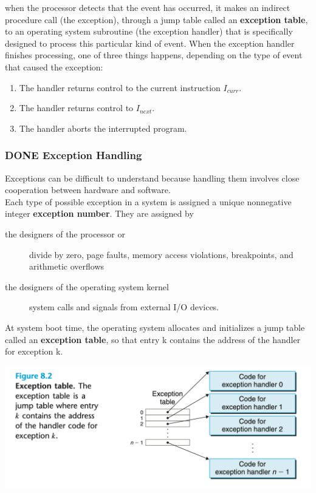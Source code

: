\documentclass[11pt]{article}
\begin{document}
when the processor detects that the event has occurred, it makes an indirect procedure call (the exception), through a jump table called an \textbf{exception table}, to an operating system subroutine (the exception handler) that is specifically designed to process this particular kind of event. When the exception handler finishes processing, one of three things happens, depending on the type of event that caused the exception:\\
\begin{enumerate}
\item The handler returns control to the current instruction \(I_{curr}\).\\
\item The handler returns control to \(I_{next}\).\\
\item The handler aborts the interrupted program.\\
\end{enumerate}


\subsubsection{{\bfseries\sffamily DONE} Exception Handling}
\label{sec:org00eaa27}
Exceptions can be difficult to understand because handling them involves close cooperation between hardware and software.\\

Each type of possible exception in a system is assigned a unique nonnegative integer \textbf{exception number}. They are assigned by\\
\begin{description}
\item[{the designers of the processor or}] divide by zero, page faults, memory access violations, breakpoints, and arithmetic overflows\\
\item[{the designers of the operating system kernel}] system calls and signals from external I/O devices.\\
\end{description}


At system boot time, the operating system allocates and initializes a jump table called an \textbf{exception table}, so that entry k contains the address of the handler for exception k.\\

\begin{center}
\includegraphics[width=.9\linewidth]{pics/figure8.2-exception-table.png}
\end{center}
\end{document}
